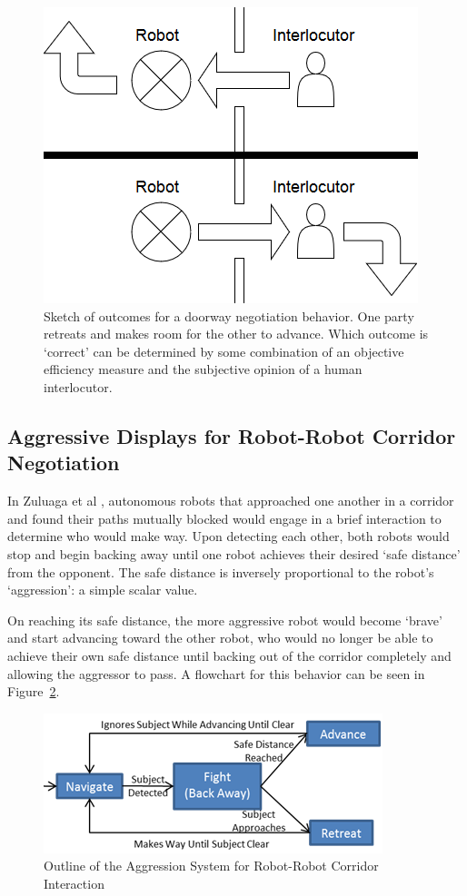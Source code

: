 \documentclass[letterpaper, 10 pt, conference]{ieeeconf}  %
\begin{document}
    \begin{figure}
      \centering
      \includegraphics[width=0.5\columnwidth]{wireframe.png}
      \caption{Sketch of outcomes for a doorway negotiation behavior. One party retreats and makes room for the other to advance. Which outcome is `correct' can be determined by some combination of an objective efficiency measure and the subjective opinion of a human interlocutor.}
      \label{fig:Wireframe}
   \end{figure}

\subsection{Aggressive Displays for Robot-Robot Corridor Negotiation}

In Zuluaga et al \cite{zuluaga2005reducing}, autonomous robots that approached one another in a corridor and found their paths mutually blocked would engage in a brief interaction to determine who would make way. Upon detecting each other, both robots would stop and begin backing away until one robot achieves their desired `safe distance' from the opponent. The safe distance is inversely proportional to the robot's `aggression': a simple scalar value.

On reaching its safe distance, the more aggressive robot would become `brave' and start advancing toward the other robot, who would no longer be able to achieve their own safe distance until backing out of the corridor completely and allowing the aggressor to pass. A flowchart for this behavior can be seen in Figure~\ref{fig:Aggressive}.
 
    \begin{figure}
      \centering
      \includegraphics{aggressive_behavior.png}
      \caption{Outline of the Aggression System for Robot-Robot Corridor Interaction}
      \label{fig:Aggressive}
   \end{figure}
 
\end{document}
